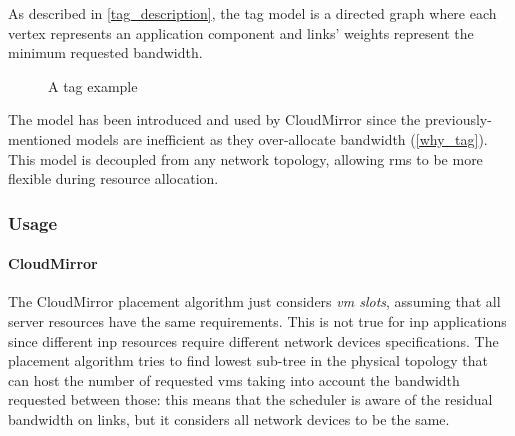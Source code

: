 
As described in \autoref{tag_description}, the \gls{tag} model is a directed graph where each vertex represents an application component and links' weights represent the minimum requested bandwidth.

\begin{figure}[!htb]
    \centering
    \usebox{\tagfigure}
    \caption{A \gls{tag} example}
\end{figure}

The model has been introduced and used by CloudMirror \cite{cloudmirror} since the previously-mentioned models are inefficient as they over-allocate bandwidth (\autoref{why_tag}).
This model is decoupled from any network topology, allowing \glspl{rm} to be more flexible during resource allocation.

\subsubsection{Usage}
\paragraph{CloudMirror \texorpdfstring{\cite{cloudmirror}}{}}
The CloudMirror \cite{cloudmirror} placement algorithm just considers \textit{\gls{vm} slots}, assuming that all server resources have the same requirements.
This is not true for \gls{inp} applications since different \gls{inp} resources require different network devices specifications.
The placement algorithm tries to find lowest sub-tree in the physical topology that can host the number of requested \glspl{vm} taking into account the bandwidth requested between those: this means that the scheduler is aware of the residual bandwidth on links, but it considers all network devices to be the same.